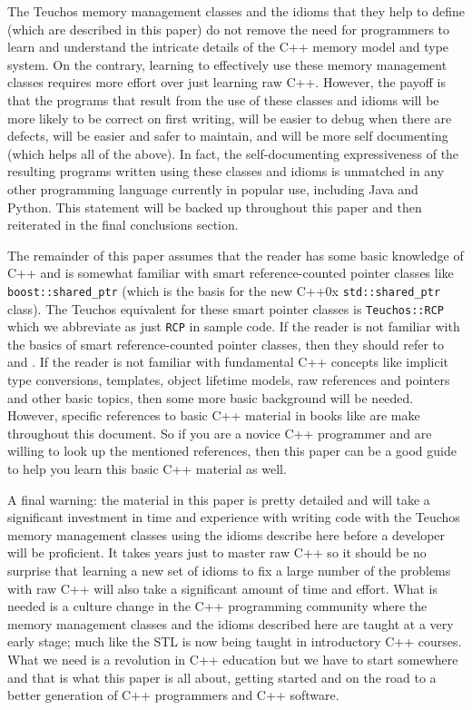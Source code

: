 \documentclass[pdf,ps2pdf,11pt]{SANDreport}
\begin{document}
The Teuchos memory management classes and the idioms that they help to
define (which are described in this paper) do not remove the need for
programmers to learn and understand the intricate details of the C++
memory model and type system.  On the contrary, learning to
effectively use these memory management classes requires more effort
over just learning raw C++.  However, the payoff is that the programs
that result from the use of these classes and idioms will be more
likely to be correct on first writing, will be easier to debug when
there are defects, will be easier and safer to maintain, and will be
more self documenting (which helps all of the above).  In fact, the
self-documenting expressiveness of the resulting programs written
using these classes and idioms is unmatched in any other programming
language currently in popular use, including Java and Python.  This
statement will be backed up throughout this paper and then reiterated
in the final conclusions section.

The remainder of this paper assumes that the reader has some basic
knowledge of C++ and is somewhat familiar with smart reference-counted
pointer classes like {}\texttt{boost::shared\_ptr} (which is the basis
for the new C++0x {}\texttt{std::shared\_ptr} class).  The Teuchos
equivalent for these smart pointer classes is {}\texttt{Teuchos::RCP}
which we abbreviate as just {}\texttt{RCP} in sample code.  If the
reader is not familiar with the basics of smart reference-counted
pointer classes, then they should refer to
{}\cite{RefCountPtrBeginnersGuide} and {}\cite{C++CodingStandards05}.
If the reader is not familiar with fundamental C++ concepts like
implicit type conversions, templates, object lifetime models, raw
references and pointers and other basic topics, then some more basic
background will be needed.  However, specific references to basic C++
material in books like {}\cite{EffectiveC++ThirdEdition, stroustrup97,
C++CodingStandards05} are make throughout this document.  So if you
are a novice C++ programmer and are willing to look up the mentioned
references, then this paper can be a good guide to help you learn this
basic C++ material as well.

A final warning: the material in this paper is pretty detailed and
will take a significant investment in time and experience with writing
code with the Teuchos memory management classes using the idioms
describe here before a developer will be proficient.  It takes years
just to master raw C++ so it should be no surprise that learning a new
set of idioms to fix a large number of the problems with raw C++ will
also take a significant amount of time and effort.  What is needed is
a culture change in the C++ programming community where the memory
management classes and the idioms described here are taught at a very
early stage; much like the STL is now being taught in introductory C++
courses.  What we need is a revolution in C++ education but we have to
start somewhere and that is what this paper is all about, getting
started and on the road to a better generation of C++ programmers and
C++ software.
\end{document}
